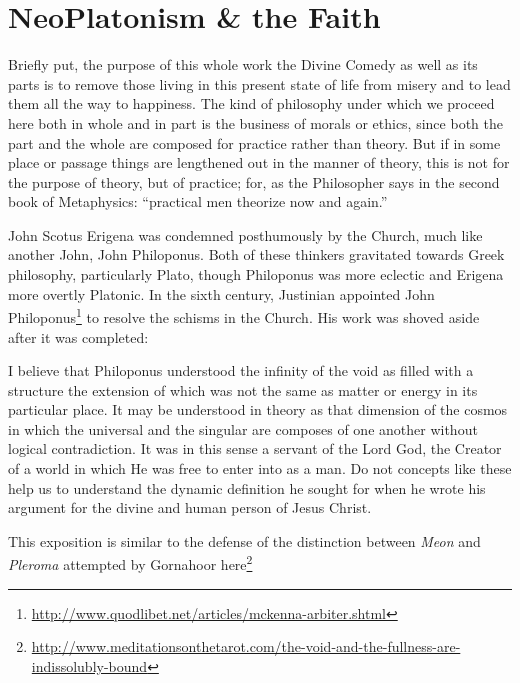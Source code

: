 \section{NeoPlatonism \& the Faith}

\begin{quotex}
Briefly put, the purpose of this whole work the Divine Comedy as well as its parts is to remove those living in this present state of life from misery and to lead them all the way to happiness. The kind of philosophy under which we proceed here both in whole and in part is the business of morals or ethics, since both the part and the whole are composed for practice rather than theory. But if in some place or passage things are lengthened out in the manner of theory, this is not for the purpose of theory, but of practice; for, as the Philosopher says in the second book of Metaphysics: ``practical men theorize now and again.'' 
\end{quotex}

John Scotus Erigena was condemned posthumously by the Church, much like another John, John Philoponus. Both of these thinkers gravitated towards Greek philosophy, particularly Plato, though Philoponus was more eclectic and Erigena more overtly Platonic. In the sixth century, Justinian appointed John Philoponus\footnote{\url{http://www.quodlibet.net/articles/mckenna-arbiter.shtml}} to resolve the schisms in the Church. His work was shoved aside after it was completed:

\begin{quotex}
I believe that Philoponus understood the infinity of the void as filled with a structure the extension of which was not the same as matter or energy in its particular place. It may be understood in theory as that dimension of the cosmos in which the universal and the singular are composes of one another without logical contradiction. It was in this sense a servant of the Lord God, the Creator of a world in which He was free to enter into as a man. Do not concepts like these help us to understand the dynamic definition he sought for when he wrote his argument for the divine and human person of Jesus Christ.
\end{quotex}


This exposition is similar to the defense of the distinction between \emph{Meon} and \emph{Pleroma} attempted by Gornahoor here\footnote{\url{http://www.meditationsonthetarot.com/the-void-and-the-fullness-are-indissolubly-bound}}

